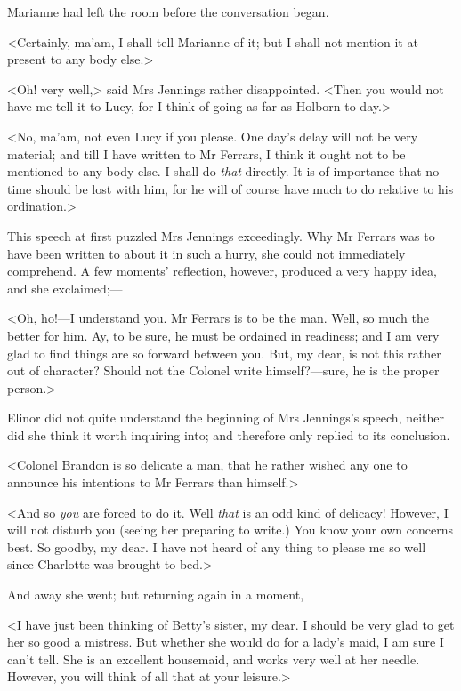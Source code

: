 Marianne had left the room before the conversation began.

<Certainly, ma'am, I shall tell Marianne of it; but I shall not mention it at present to any body else.>

<Oh! very well,> said Mrs Jennings rather disappointed. <Then you would not have me tell it to Lucy, for I think of going as far as Holborn to-day.>

<No, ma'am, not even Lucy if you please. One day's delay will not be very material; and till I have written to Mr Ferrars, I think it ought not to be mentioned to any body else. I shall do \textit{that} directly. It is of importance that no time should be lost with him, for he will of course have much to do relative to his ordination.>

This speech at first puzzled Mrs Jennings exceedingly. Why Mr Ferrars was to have been written to about it in such a hurry, she could not immediately comprehend. A few moments' reflection, however, produced a very happy idea, and she exclaimed;—

<Oh, ho!—I understand you. Mr Ferrars is to be the man. Well, so much the better for him. Ay, to be sure, he must be ordained in readiness; and I am very glad to find things are so forward between you. But, my dear, is not this rather out of character? Should not the Colonel write himself?—sure, he is the proper person.>

Elinor did not quite understand the beginning of Mrs Jennings's speech, neither did she think it worth inquiring into; and therefore only replied to its conclusion.

<Colonel Brandon is so delicate a man, that he rather wished any one to announce his intentions to Mr Ferrars than himself.>

<And so \textit{you} are forced to do it. Well \textit{that} is an odd kind of delicacy! However, I will not disturb you (seeing her preparing to write.) You know your own concerns best. So goodby, my dear. I have not heard of any thing to please me so well since Charlotte was brought to bed.>

And away she went; but returning again in a moment,

<I have just been thinking of Betty's sister, my dear. I should be very glad to get her so good a mistress. But whether she would do for a lady's maid, I am sure I can't tell. She is an excellent housemaid, and works very well at her needle. However, you will think of all that at your leisure.>

